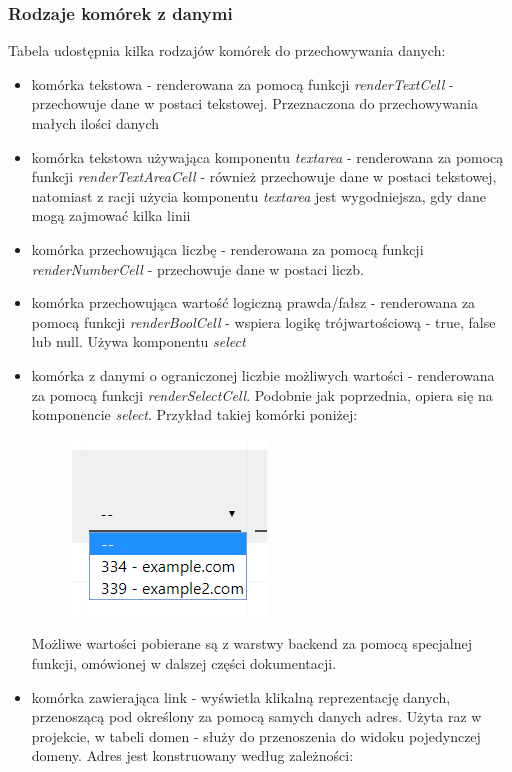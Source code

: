 \documentclass[11pt]{article}
\begin{document}
\subsubsection{Rodzaje komórek z danymi}
Tabela udostępnia kilka rodzajów komórek do przechowywania danych:
\begin{itemize}
\item komórka tekstowa - renderowana za pomocą funkcji \emph{renderTextCell} - przechowuje dane w postaci tekstowej. Przeznaczona do przechowywania małych ilości danych
\item komórka tekstowa używająca komponentu \emph{textarea} - renderowana za pomocą funkcji \emph{renderTextAreaCell} - również przechowuje dane w postaci tekstowej, natomiast z racji użycia komponentu \emph{textarea} jest wygodniejsza, gdy dane mogą zajmować kilka linii
\item komórka przechowująca liczbę - renderowana za pomocą funkcji \emph{renderNumberCell} - przechowuje dane w postaci liczb. 
\item komórka przechowująca wartość logiczną prawda/fałsz - renderowana za pomocą funkcji \emph{renderBoolCell} - wspiera logikę trójwartościową - true, false lub null. Używa komponentu \emph{select}
\item komórka z danymi o ograniczonej liczbie możliwych wartości - renderowana za pomocą funkcji \emph{renderSelectCell}. Podobnie jak poprzednia, opiera się na komponencie \emph{select}. Przykład takiej komórki poniżej:
\begin{figure}[H]
\centering
\includegraphics[scale=1]{res/front_tabela_selectcell}
\end{figure}
Możliwe wartości pobierane są z warstwy backend za pomocą specjalnej funkcji, omówionej w dalszej części dokumentacji.
\item komórka zawierająca link - wyświetla klikalną reprezentację danych, przenoszącą pod określony za pomocą samych danych adres. Użyta raz w projekcie, w tabeli domen - służy do przenoszenia do widoku pojedynczej domeny. Adres jest konstruowany według zależności:
\begin{equation}

\end{equation}
\end{itemize}
\end{document}
